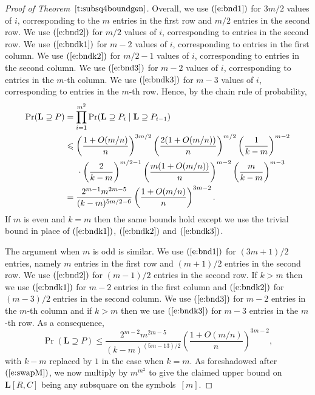 \documentclass[12pt]{article}
\theoremstyle{definition}
\numberwithin{equation}{section}
\def\eref#1{$(\ref{#1})$}
\def\tref#1{Theorem~$\ref{#1}$}
\renewcommand{\leq}{\leqslant}
\renewcommand{\L}{\mathbf{L}}
\begin{document}
\begin{proof}[Proof of \tref{t:subsq4boundgen}]
		Overall, we use \eref{e:bnd1} for $3m/2$ values of $i$, corresponding
		to the $m$ entries in the first row and $m/2$ entries in the second
		row. We use \eref{e:bnd2} for $m/2$ values of $i$, corresponding to
		entries in the second row. We use \eref{e:bndk1} for $m-2$ values of
		$i$, corresponding to entries in the first column. We use
		\eref{e:bndk2} for $m/2-1$ values of $i$, corresponding to entries in
		the second column. We use \eref{e:bnd3} for $m-2$ values of $i$,
		corresponding to entries in the $m$-th column. We use \eref{e:bndk3}
		for $m-3$ values of $i$, corresponding to entries in the $m$-th row.
		Hence, by the chain rule of probability,
		\begin{align}
			\Pr(\L \supseteq P) &= \prod_{i=1}^{m^2} \Pr(\L \supseteq P_i \mid  \L \supseteq P_{i-1}) \nonumber\\
			&\leq \left(\frac{1+O(m/n)}n\right)^{3m/2}\left(\frac{2(1+O(m/n))}n\right)^{m/2}\left(\frac1{k-m}\right)^{m-2} \\
			&\hspace{5mm}\cdot\left(\frac{2}{k-m}\right)^{m/2-1}\left(\frac{m(1+O(m/n))}n\right)^{m-2}\left(\frac{m}{k-m}\right)^{m-3} \nonumber\\
			&= \frac{2^{m-1}m^{2m-5}}{(k-m)^{5m/2-6}}\left(\frac{1+O(m/n)}n\right)^{3m-2}.\label{e:evencase}
		\end{align}
		If $m$ is even and $k=m$ then the same bounds hold except we use the trivial
		bound in place of \eref{e:bndk1}, \eref{e:bndk2} and \eref{e:bndk3}.
		
		
		The argument when $m$ is odd is similar. We use \eref{e:bnd1} for
		$(3m+1)/2$ entries, namely $m$ entries in the first row and $(m+1)/2$
		entries in the second row. We use \eref{e:bnd2} for $(m-1)/2$ entries
		in the second row. If $k>m$ then we use \eref{e:bndk1} for $m-2$ entries in the
		first column and \eref{e:bndk2} for $(m-3)/2$ entries in the
		second column. We use \eref{e:bnd3} for $m-2$ entries in the $m$-th
		column and if $k>m$ then we use \eref{e:bndk3} for $m-3$ entries in the $m$-th
		row. As a consequence,
		\begin{equation}\label{e:oddcase}
			\Pr(\L \supseteq P) \leq \frac{2^{m-2}m^{2m-5}}{(k-m)^{(5m-13)/2}}\left(\frac{1+O(m/n)}n\right)^{3m-2},
		\end{equation}
		with $k-m$ replaced by $1$ in the case when $k=m$.
		As foreshadowed after \eref{e:swapM}, we now
		multiply by $m^{m^2}$ to give the claimed upper bound
		on $\L[R, C]$ being any subsquare on the symbols~$[m]$.
	\end{proof}
	
\end{document}
